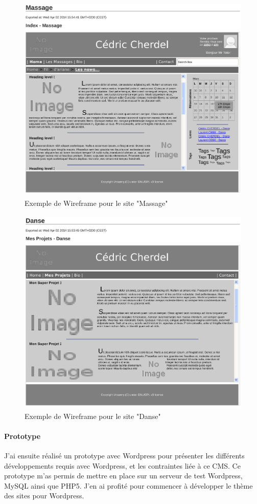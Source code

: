 \documentclass[11pt,a4paper]{report}
\begin{document}
				\begin{figure}[H]
					\centering
					\includegraphics[height=10cm]{Wireframe-Massage_1.eps}
					\caption{Exemple de Wireframe pour le site "Massage"}
					\label{fig:Wireframe Massage}
				\end{figure}
				\begin{figure}[H]
					\centering
					\includegraphics[height=10cm]{Wireframe-Danse_1.eps}
					\caption{Exemple de Wireframe pour le site "Danse"}
					\label{fig:Wireframe Danse}
				\end{figure}

			\paragraph*{Prototype}J'ai ensuite réalisé un prototype avec Wordpress pour présenter les différents développements requis avec Wordpress, et les contraintes liée à ce CMS. Ce prototype m'as permis de mettre en place sur un serveur de test Wordpress, MySQL ainsi que PHP5. J'en ai profité pour commencer à développer le thème des sites pour Wordpress.
\end{document}

